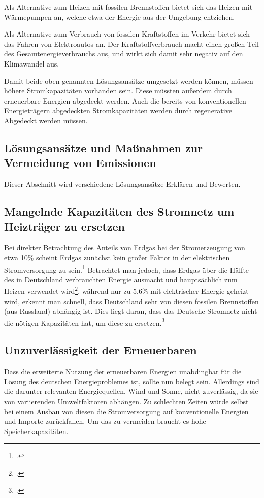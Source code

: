 \documentclass[12pt, ngerman]{article}
\begin{document}
Als Alternative zum Heizen mit fossilen Brennstoffen bietet sich
das Heizen mit Wärmepumpen an, welche etwa \unit{} der
Energie aus der Umgebung entziehen.

Als Alternative zum Verbrauch von fossilen Kraftstoffen im Verkehr bietet
sich das Fahren von Elektroautos an. Der Kraftstoffverbrauch macht einen
großen Teil des Gesamtenergieverbrauchs aus, und wirkt sich damit sehr
negativ auf den Klimawandel aus.

Damit beide oben genannten Lösungsansätze umgesetzt werden können, müssen
höhere Stromkapazitäten vorhanden sein. Diese müssten außerdem durch erneuerbare
Energien abgedeckt werden. Auch die bereits von konventionellen Energieträgern
abgedeckten Stromkapazitäten werden durch regenerative Abgedeckt werden müssen.

\subsection{Lösungsansätze und Maßnahmen zur Vermeidung von Emissionen}

Dieser Abschnitt wird verschiedene Lösungsansätze Erklären und Bewerten.






\subsection{Mangelnde Kapazitäten des Stromnetz um Heizträger zu ersetzen}
Bei direkter Betrachtung des Anteils von Erdgas bei der Stromerzeugung von etwa 10\% scheint Erdgas zunächst
kein großer Faktor in der elektrischen Stromversorgung zu sein.\footcite{SMARDHoherEEAnteil,EnergieWofuerErdgas}
Betrachtet man jedoch, dass Erdgas über die Hälfte des in Deutschland verbrauchten
Energie ausmacht und hauptsächlich zum Heizen verwendet wird\footcite{Anwendungsbereiche,EnergieWofuerErdgas},
während nur zu 5,6\% mit elektrischer Energie geheizt wird, erkennt man schnell, dass Deutschland sehr von diesen
fossilen Brennstoffen (aus Russland) abhängig ist.
Dies liegt daran, dass das Deutsche Stromnetz nicht die nötigen Kapazitäten hat, um diese zu
ersetzen.\footcite{EnergieWofuerErdgas}



\subsection{Unzuverlässigkeit der Erneuerbaren}
Dass die erweiterte Nutzung der erneuerbaren Energien unabdingbar für die Lösung des deutschen Energieproblemes
ist, sollte nun belegt sein. Allerdings sind die darunter relevanten Energiequellen, Wind und Sonne, nicht
zuverlässig, da sie von variierenden Umweltfaktoren abhängen. Zu schlechten Zeiten würde selbst bei einem Ausbau
von diesen die Stromversorgung auf konventionelle Energien und Importe zurückfallen. Um das zu vermeiden braucht
es hohe Speicherkapazitäten.
\end{document}
